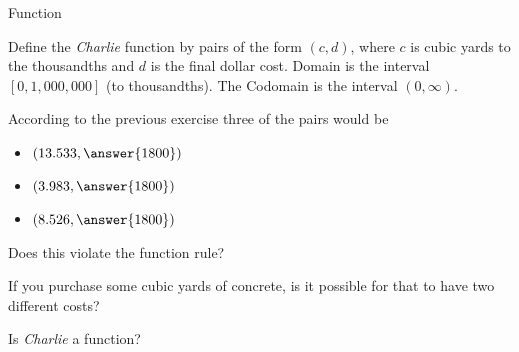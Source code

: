 \documentclass{ximera}
\begin{document}
\begin{exercise} Function

Define the \textit{Charlie} function by pairs of the form $(c, d)$, where $c$ is cubic yards to the thousandths and $d$ is the final dollar cost.  Domain is the interval $[0, 1,000,000]$ (to thousandths). The Codomain is the interval $(0, \infty)$.

According to the previous exercise three of the pairs would be

\begin{itemize}
\item $\left( 13.533, \answer{1800} \right)$
\item $\left( 3.983, \answer{1800} \right)$
\item $\left( 8.526, \answer{1800} \right)$
\end{itemize}


Does this violate the function rule?
\begin{multipleChoice}
\end{multipleChoice}




If you purchase some cubic yards of concrete, is it possible for that to have two different costs?
\begin{multipleChoice}
\end{multipleChoice}









Is \textit{Charlie} a function?
\begin{multipleChoice}
\end{multipleChoice}





\end{exercise}
\end{document}
